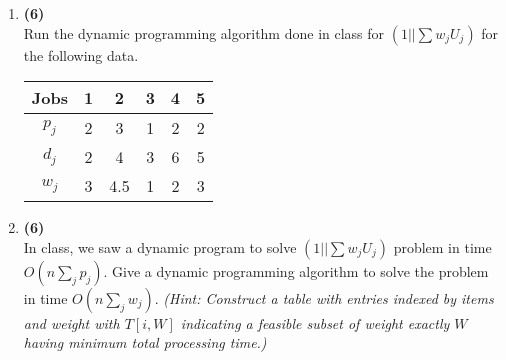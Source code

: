 \documentclass[10pt]{article}
\begin{document}
\MakeScribeTop
\begin{enumerate}
\item {\bf (6)} \\
Run the dynamic programming algorithm done in class for $(1||\sum w_jU_j)$ for the following data.
\begin{center}
\begin{tabular}{|c|c|c|c|c|c|}
\hline
Jobs &   1 & 2 & 3 & 4 & 5 \\ \hline
$p_j$ &  2 & 3 & 1 & 2 & 2\\
$d_j$ &  2 & 4 & 3  & 6 & 5\\
$w_j$ & 3 & 4.5 & 1 & 2 & 3\\
\hline
\end{tabular}
\end{center}


\item {\bf (6)}\\
In class, we saw a dynamic program to solve $(1||\sum w_jU_j)$ problem in time $O(n\sum_j p_j)$. Give a dynamic programming algorithm to solve the problem in time $O(n \sum_j w_j)$. {\em (Hint: Construct a table with entries indexed by items and weight with $T[i,W]$ indicating a feasible subset of weight exactly $W$ having minimum total processing time.)}




\end{enumerate}
\end{document}
